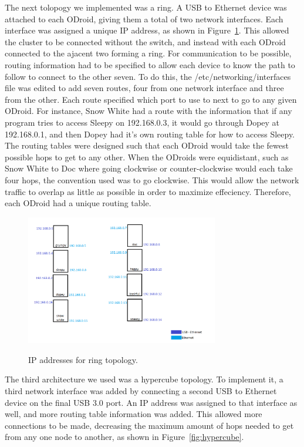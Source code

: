 	The next tolopogy we implemented was a ring. A USB to Ethernet device was attached to each ODroid, giving them a total of two network interfaces. Each interface was assigned a unique IP address, as shown in Figure~\ref{fig:ipaddresses}. This allowed the cluster to be connected without the switch, and instead with each ODroid connected to the ajacent two forming a ring. For communication to be possible, routing information had to be specified to allow each device to know the path to follow to connect to the other seven. To do this, the /etc/networking/interfaces file was edited to add seven routes, four from one network interface and three from the other. Each route specified which port to use to next to go to any given ODroid. For instance, Snow White had a route with the information that if any program tries to access Sleepy on 192.168.0.3, it would go through Dopey at 192.168.0.1, and then Dopey had it's own routing table for how to access Sleepy.
	The routing tables were designed such that each ODroid would take the fewest possible hops to get to any other. When the ODroids were equidistant, such as Snow White to Doc where going clockwise or counter-clockwise would each take four hops, the convention used was to go clockwise. This would allow the network traffic to overlap as little as possible in order to maximize effeciency. Therefore, each ODroid had a unique routing table. 

\begin{figure}[tbh]
	\caption{IP addresses for ring topology.}
	\centering
		\includegraphics[width=0.75\textwidth]{cluster_ipaddresses.png}
	\label{fig:ipaddresses}
\end{figure}

	The third architecture we used was a hypercube topology. To implement it, a third network interface was added by connecting a second USB to Ethernet device on the final USB 3.0 port. An IP address was assigned to that interface as well, and more routing table information was added. This allowed more connections to be made, decreasing the maximum amount of hops needed to get from any one node to another, as shown in Figure~\ref{fig:hypercube}. 

